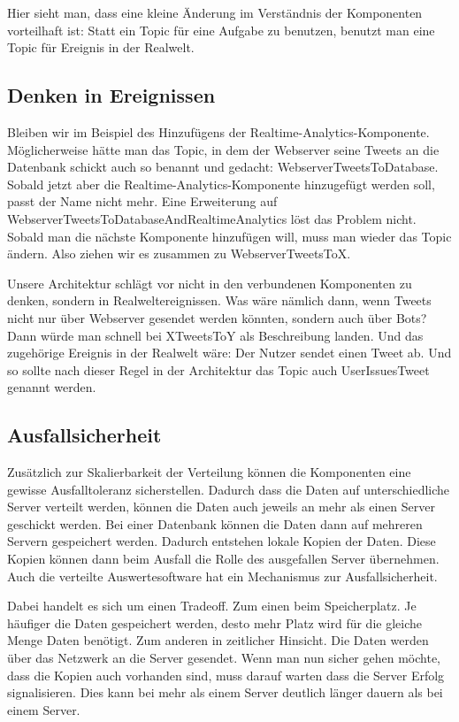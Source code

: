Hier sieht man, dass eine kleine Änderung im Verständnis der Komponenten vorteilhaft ist: Statt ein Topic für eine Aufgabe
zu benutzen, benutzt man eine Topic für Ereignis in der Realwelt.

\subsection{Denken in Ereignissen}
Bleiben wir im Beispiel des Hinzufügens der Realtime-Analytics-Komponente. Möglicherweise hätte man das Topic, in dem
der Webserver seine Tweets an die Datenbank schickt auch so benannt und gedacht: WebserverTweetsToDatabase. Sobald
jetzt aber die Realtime-Analytics-Komponente hinzugefügt werden soll, passt der Name nicht mehr. Eine Erweiterung auf
WebserverTweetsToDatabaseAndRealtimeAnalytics löst das Problem nicht. Sobald man die nächste Komponente hinzufügen
will, muss man wieder das Topic ändern. Also ziehen wir es zusammen zu WebserverTweetsToX. 

Unsere Architektur schlägt vor nicht in den verbundenen Komponenten zu denken, sondern in Realweltereignissen.
Was wäre nämlich dann, wenn Tweets nicht nur über Webserver gesendet werden könnten, sondern auch über Bots?
Dann würde man schnell bei XTweetsToY als Beschreibung landen. Und das zugehörige Ereignis in der Realwelt wäre:
Der Nutzer sendet einen Tweet ab. Und so sollte nach dieser Regel in der Architektur das Topic auch UserIssuesTweet genannt
werden.


\subsection{Ausfallsicherheit}

Zusätzlich zur Skalierbarkeit der Verteilung können die Komponenten eine gewisse Ausfalltoleranz sicherstellen.
Dadurch dass die Daten auf unterschiedliche Server verteilt werden, können die Daten auch jeweils an mehr als
einen Server geschickt werden.  Bei einer Datenbank können die Daten dann auf mehreren Servern gespeichert werden.
Dadurch entstehen lokale Kopien der Daten. Diese Kopien können dann beim Ausfall die Rolle des ausgefallen
Server übernehmen. Auch die verteilte Auswertesoftware hat ein Mechanismus zur Ausfallsicherheit.

Dabei handelt es sich um einen Tradeoff. Zum einen beim Speicherplatz. Je häufiger die Daten
gespeichert werden, desto mehr Platz wird für die gleiche Menge Daten benötigt. Zum anderen in zeitlicher Hinsicht.
Die Daten werden über das Netzwerk an die Server gesendet. Wenn man nun sicher gehen möchte, dass die Kopien
auch vorhanden sind, muss darauf warten dass die Server Erfolg signalisieren. Dies kann bei mehr als einem Server deutlich
länger dauern als bei einem Server.

